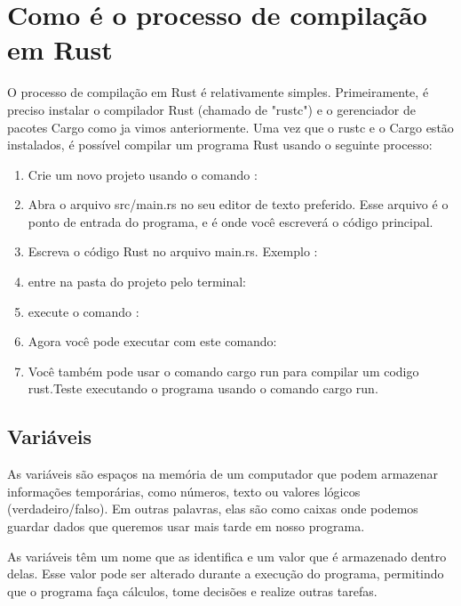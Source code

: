 \documentclass[12pt,a4paper,oneside]{abntex2}
\begin{document}
\section{Como é o processo de compilação em Rust}

O processo de compilação em Rust é relativamente simples. Primeiramente, é preciso instalar o compilador Rust (chamado de "rustc") e o gerenciador de pacotes Cargo como ja vimos anteriormente.
Uma vez que o rustc e o Cargo estão instalados, é possível compilar um programa Rust usando o seguinte processo:
\begin{enumerate}
    \item Crie um novo projeto usando o comando :
    \item Abra o arquivo src/main.rs no seu editor de texto preferido. Esse arquivo é o ponto de entrada do programa, e é onde você escreverá o código principal.
    \item Escreva o código Rust no arquivo main.rs. Exemplo :
    \item entre na pasta do projeto pelo terminal:
    \item execute o comando :
    \item Agora você pode executar com este comando:
    \item Você também pode usar o comando  cargo run para compilar um codigo rust.Teste executando o programa usando o comando cargo run.
\end{enumerate}

\subsection{Variáveis}
As variáveis são espaços na memória de um computador que podem armazenar informações temporárias, como números, texto ou valores lógicos (verdadeiro/falso). Em outras palavras, elas são como caixas onde podemos guardar dados que queremos usar mais tarde em nosso programa.

As variáveis têm um nome que as identifica e um valor que é armazenado dentro delas. Esse valor pode ser alterado durante a execução do programa, permitindo que o programa faça cálculos, tome decisões e realize outras tarefas.
\end{document}
